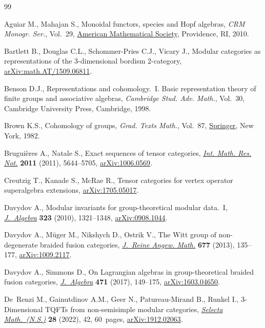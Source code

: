 \begin{thebibliography}{99}
\footnotesize\itemsep=0pt

Aguiar M., Mahajan S., Monoidal functors, species and {H}opf algebras,
 \textit{CRM Monogr. Ser.}, Vol.~29, \href{https://doi.org/10.1090/crmm/029}{American Mathematical Society},
 Providence, RI, 2010.

Bartlett B., Douglas C.L., Schommer-Pries C.J., Vicary J., Modular categories
 as representations of the 3-dimensional bordism 2-category,
 \href{https://arxiv.org/abs/math.AT/1509.06811}{arXiv:math.AT/1509.06811}.

Benson D.J., Representations and cohomology.~{I}. {B}asic representation theory
 of finite groups and associative algebras, \textit{Cambridge Stud. Adv.
 Math.}, Vol.~30, Cambridge University Press, Cambridge, 1998.

Brown K.S., Cohomology of groups, \textit{Grad. Texts Math.}, Vol.~87,
 \href{https://doi.org/10.1007/978-1-4684-9327-6}{Springer}, New York, 1982.

Brugui\`eres A., Natale S., Exact sequences of tensor categories, \href{https://doi.org/10.1093/imrn/rnq294}{\textit{Int.
 Math. Res. Not.}} \textbf{2011} (2011), 5644--5705, \href{https://arxiv.org/abs/1006.0569}{arXiv:1006.0569}.

Creutzig T., Kanade S., McRae R., Tensor categories for vertex operator
 superalgebra extensions, \href{https://arxiv.org/abs/1705.05017}{arXiv:1705.05017}.

Davydov A., Modular invariants for group-theoretical modular data.~{I},
 \href{https://doi.org/10.1016/j.jalgebra.2009.11.041}{\textit{J.~Algebra}} \textbf{323} (2010), 1321--1348, \href{https://arxiv.org/abs/0908.1044}{arXiv:0908.1044}.

Davydov A., M\"uger M., Nikshych D., Ostrik V., The {W}itt group of
 non-degenerate braided fusion categories, \href{https://doi.org/10.1515/crelle.2012.014}{\textit{J.~Reine Angew. Math.}}
 \textbf{677} (2013), 135--177, \href{https://arxiv.org/abs/1009.2117}{arXiv:1009.2117}.

Davydov A., Simmons D., On {L}agrangian algebras in group-theoretical braided
 fusion categories, \href{https://doi.org/10.1016/j.jalgebra.2016.09.016}{\textit{J.~Algebra}} \textbf{471} (2017), 149--175,
 \href{https://arxiv.org/abs/1603.04650}{arXiv:1603.04650}.

De~Renzi M., Gainutdinov A.M., Geer N., Patureau-Mirand B., Runkel I.,
 3-{D}imensional {TQFT}s from non-semisimple modular categories,
 \href{https://doi.org/10.1007/s00029-021-00737-z}{\textit{Selecta Math.~(N.S.)}} \textbf{28} (2022), 42, 60~pages,
 \href{https://arxiv.org/abs/1912.02063}{arXiv:1912.02063}.


\end{thebibliography}
